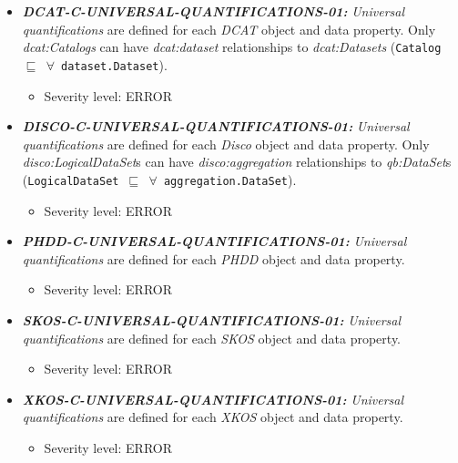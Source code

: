 \documentclass{llncs}
\newcommand{\ms}[1]{\texttt{#1}}
\begin{document}
\begin{itemize}
	\item \textbf{{\em DCAT-C-UNIVERSAL-QUANTIFICATIONS-01:}}
	\emph{Universal quantifications} are defined for each \emph{DCAT} object and data property.
	Only {\em dcat:Catalogs} can have {\em dcat:dataset} relationships to {\em dcat:Datasets} (\ms{Catalog $\sqsubseteq$ $\forall$ dataset.Dataset}).
	\begin{itemize}
		\item Severity level: ERROR
	\end{itemize}
\end{itemize}

\begin{itemize}
	\item \textbf{{\em DISCO-C-UNIVERSAL-QUANTIFICATIONS-01:}}
	\emph{Universal quantifications} are defined for each \emph{Disco} object and data property.
  Only {\em disco:LogicalDataSet}s can have {\em disco:aggregation} relationships to {\em qb:DataSet}s (\ms{LogicalDataSet $\sqsubseteq$ $\forall$ aggregation.DataSet}).
	\begin{itemize}
		\item Severity level: ERROR
	\end{itemize}
\end{itemize}

\begin{itemize}
	\item \textbf{{\em PHDD-C-UNIVERSAL-QUANTIFICATIONS-01:}}
	\emph{Universal quantifications} are defined for each \emph{PHDD} object and data property.
	\begin{itemize}
		\item Severity level: ERROR
	\end{itemize}
\end{itemize}

\begin{itemize}
	\item \textbf{{\em SKOS-C-UNIVERSAL-QUANTIFICATIONS-01:}}
	\emph{Universal quantifications} are defined for each \emph{SKOS} object and data property.
	\begin{itemize}
		\item Severity level: ERROR
	\end{itemize}
\end{itemize}

\begin{itemize}
	\item \textbf{{\em XKOS-C-UNIVERSAL-QUANTIFICATIONS-01:}}
	\emph{Universal quantifications} are defined for each \emph{XKOS} object and data property.
	\begin{itemize}
		\item Severity level: ERROR
	\end{itemize}
\end{itemize}
\end{document}
